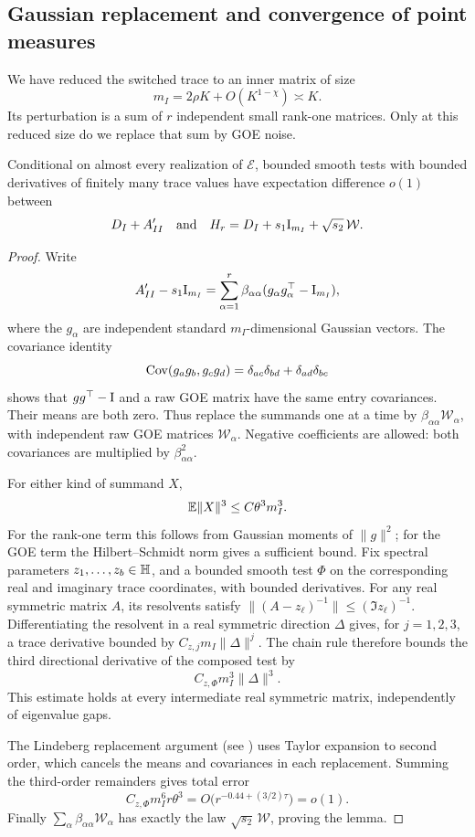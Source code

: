\subsection{Gaussian replacement and convergence of point measures}

We have reduced the switched trace to an inner matrix of size
\[
 m_I=2\rho K+O(K^{1-\chi})\asymp K.
\]
Its perturbation is a sum of \(r\) independent small rank-one matrices.
Only at this reduced size do we replace that sum by GOE noise.

\begin{lemma}\label{sw:lindeberg}
Conditional on almost every realization of \(\mathcal E\), bounded smooth tests with bounded
derivatives of finitely many trace values have expectation difference
\(o(1)\) between
\[
 D_I+A'_{II}
 \quad\hbox{and}\quad
 H_r=D_I+s_1\mathrm I_{m_I}+\sqrt{s_2}\,\mathcal W.
\]
\end{lemma}

\begin{proof}
Write
\[
 A'_{II}-s_1\mathrm I_{m_I}
 =\sum_{\alpha=1}^{r}
 \beta_{\alpha\alpha}(g_\alpha g_\alpha^\top-\mathrm I_{m_I}),
\]
where the \(g_\alpha\) are independent standard \(m_I\)-dimensional
Gaussian vectors. The covariance identity
\[
 \operatorname{Cov}(g_ag_b,g_cg_d)
 =\delta_{ac}\delta_{bd}+\delta_{ad}\delta_{bc}
\]
shows that \(gg^\top-\mathrm I\) and a raw GOE matrix have the same entry
covariances. Their means are both zero. Thus replace the summands one at
a time by \(\beta_{\alpha\alpha}\mathcal W_\alpha\), with independent raw
GOE matrices \(\mathcal W_\alpha\). Negative coefficients are allowed:
both covariances are multiplied by \(\beta_{\alpha\alpha}^2\).

For either kind of summand \(X\),
\[
 \mathbb E\|X\|^3\le C\theta^3m_I^3.
\]
For the rank-one term this follows from Gaussian moments of \(\|g\|^2\);
for the GOE term the Hilbert--Schmidt norm gives a sufficient bound.
Fix spectral parameters \(z_1,\ldots,z_b\in\mathbb H\), and a bounded smooth
test \(\Phi\) on the corresponding real and imaginary trace coordinates,
with bounded derivatives. For any real symmetric matrix \(A\), its
resolvents satisfy \(\|(A-z_\ell)^{-1}\|\le(\Im z_\ell)^{-1}\).
Differentiating the resolvent in a real symmetric direction \(\Delta\)
gives, for \(j=1,2,3\), a trace derivative bounded by
\(C_{z,j}m_I\|\Delta\|^j\). The chain rule therefore bounds the third
directional derivative of the composed test by
\[
 C_{z,\Phi}m_I^3\|\Delta\|^3.
\]
This estimate holds at every intermediate real symmetric matrix,
independently of eigenvalue gaps.

The Lindeberg replacement argument (see \cite{Chatterjee2006}) uses Taylor expansion to second order, which cancels the means and covariances in
each replacement. Summing the third-order remainders gives total error
\[
 C_{z,\Phi}m_I^6 r\theta^3
 =O\bigl(r^{-0.44+(3/2)\tau}\bigr)=o(1).
\]
Finally \(\sum_\alpha\beta_{\alpha\alpha}\mathcal W_\alpha\) has exactly
the law \(\sqrt{s_2}\,\mathcal W\), proving the lemma.
\end{proof}

